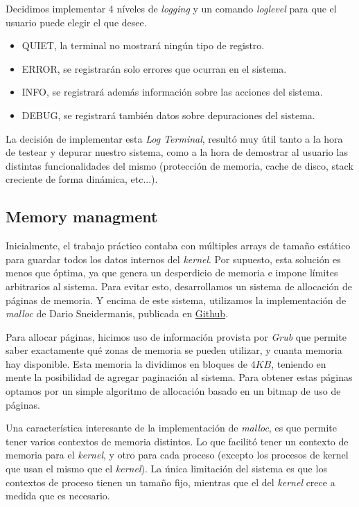 \documentclass[a4paper,10pt]{article}
\begin{document}
        Decidimos implementar 4 níveles de \textit{logging} y un comando \textit{loglevel} para que el usuario puede elegir el que desee.\\

        \begin{itemize}
        \item QUIET, la terminal no mostrará ningún tipo de registro.
        \item ERROR, se registrarán solo errores que ocurran en el sistema.
        \item INFO, se registrará además información sobre las acciones del sistema.
        \item DEBUG, se registrará también datos sobre depuraciones del sistema.
        \end{itemize}

        La decisión de implementar esta \textit{Log Terminal}, resultó muy útil tanto a la hora de testear y depurar nuestro sistema, como a la hora de demostrar al 
        usuario las distintas funcionalidades del mismo (protección de memoria, cache de disco, stack creciente de forma dinámica, etc...).\\


        \subsection{Memory managment}
        Inicialmente, el trabajo práctico contaba con múltiples arrays de tamaño estático para guardar todos los datos internos del \textit{kernel}.
        Por supuesto, esta solución es menos que óptima, ya que genera un desperdicio de memoria e impone límites arbitrarios al sistema.
        Para evitar esto, desarrollamos un sistema de allocación de páginas de memoria.
        Y encima de este sistema, utilizamos la implementación de \textit{malloc} de Dario Sneidermanis, publicada en \href{https://github.com/esneider/malloc}{Github}.

        Para allocar páginas, hicimos uso de información provista por \textit{Grub} que permite saber exactamente qué zonas de memoria se pueden utilizar, 
        y cuanta memoria hay disponible.
        Esta memoria la dividimos en bloques de $4KB$, teniendo en mente la posibilidad de agregar paginación al sistema.
        Para obtener estas páginas optamos por un simple algoritmo de allocación basado en un bitmap de uso de páginas.

        Una característica interesante de la implementación de \textit{malloc}, es que permite tener varios contextos de memoria distintos.
        Lo que facilitó tener un contexto de memoria para el \textit{kernel}, y otro para cada proceso (excepto los procesos de kernel que usan el mismo 
        que el \textit{kernel}).
        La única limitación del sistema es que los contextos de proceso tienen un tamaño fijo, mientras que el del  \textit{kernel} crece a medida que es necesario.\\
\end{document}
